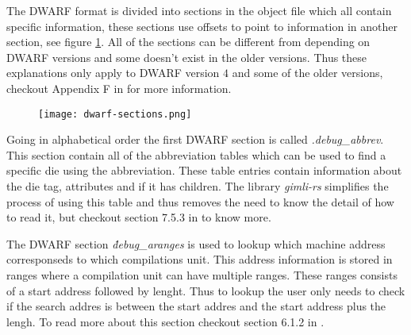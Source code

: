  


The \gls{DWARF} format is divided into sections in the object file which all contain specific information, these sections use offsets to point to information in another section, see figure \ref{fig:dwarfsections}.
All of the sections can be different from depending on \gls{DWARF} versions and some doesn't exist in the older versions.
Thus these explanations only apply to \gls{DWARF} version $4$ and some of the older versions, checkout Appendix F in \cite{dwarf} for more information.


\begin{figure}[h]
    \centering
    \texttt{[image: dwarf-sections.png]}
    \label{fig:dwarfsections}
\end{figure}


Going in alphabetical order the first \gls{DWARF} section is called \emph{.debug\_abbrev}.
This section contain all of the abbreviation tables which can be used to find a specific die using the abbreviation.
These table entries contain information about the die tag, attributes and if it has children.
The library \emph{gimli-rs} simplifies the process of using this table and thus removes the need to know the detail of how to read it, but checkout section 7.5.3 in \cite{dwarf} to know more.


The \gls{DWARF} section \emph{\.debug\_aranges} is used to lookup which machine address corresponseds to which compilations unit.
This address information is stored in ranges where a compilation unit can have multiple ranges.
These ranges consists of a start address followed by lenght.
Thus to lookup the user only needs to check if the search addres is between the start addres and the start address plus the lengh.
To read more about this section checkout section 6.1.2 in \cite{dwarf}.


